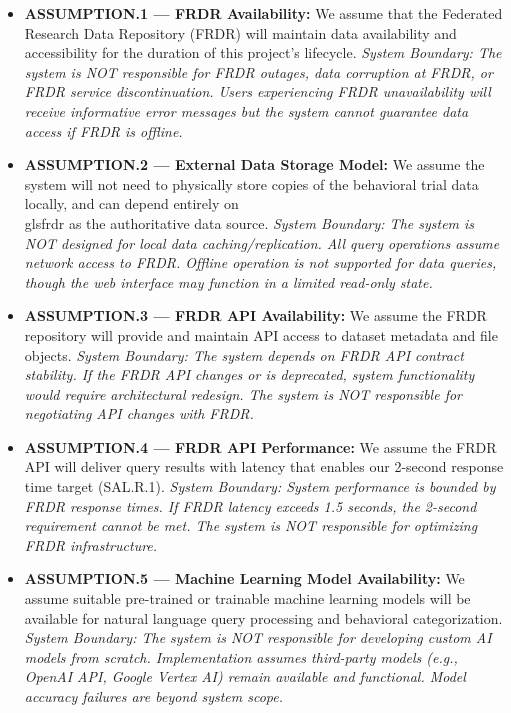 \documentclass[12pt]{article}
\begin{document}
\begin{itemize}
    \item \textbf{ASSUMPTION.1 --- FRDR Availability:} We assume that the Federated Research Data Repository (FRDR) will maintain data availability and accessibility for the duration of this project's lifecycle. \textit{System Boundary: The system is NOT responsible for FRDR outages, data corruption at FRDR, or FRDR service discontinuation. Users experiencing FRDR unavailability will receive informative error messages but the system cannot guarantee data access if FRDR is offline.}
    
    \item \textbf{ASSUMPTION.2 --- External Data Storage Model:} We assume the system will not need to physically store copies of the behavioral trial data locally, and can depend entirely on \\gls{frdr} as the authoritative data source. \textit{System Boundary: The system is NOT designed for local data caching/replication. All query operations assume network access to FRDR. Offline operation is not supported for data queries, though the web interface may function in a limited read-only state.}
    
    \item \textbf{ASSUMPTION.3 --- FRDR API Availability:} We assume the FRDR repository will provide and maintain API access to dataset metadata and file objects. \textit{System Boundary: The system depends on FRDR API contract stability. If the FRDR API changes or is deprecated, system functionality would require architectural redesign. The system is NOT responsible for negotiating API changes with FRDR.}
    
    \item \textbf{ASSUMPTION.4 --- FRDR API Performance:} We assume the FRDR API will deliver query results with latency that enables our 2-second response time target (SAL.R.1). \textit{System Boundary: System performance is bounded by FRDR response times. If FRDR latency exceeds 1.5 seconds, the 2-second requirement cannot be met. The system is NOT responsible for optimizing FRDR infrastructure.}
    
    \item \textbf{ASSUMPTION.5 --- Machine Learning Model Availability:} We assume suitable pre-trained or trainable machine learning models will be available for natural language query processing and behavioral categorization. \textit{System Boundary: The system is NOT responsible for developing custom AI models from scratch. Implementation assumes third-party models (e.g., OpenAI API, Google Vertex AI) remain available and functional. Model accuracy failures are beyond system scope.}
    

\end{itemize}
\end{document}
